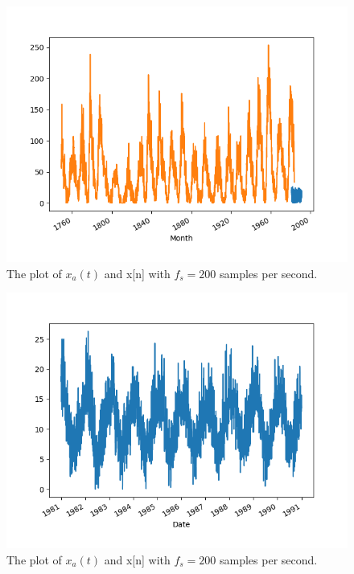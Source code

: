 \documentclass[12pt]{article}
\begin{document}
\begin{enumerate}
\begin{figure}[H]
    \centering
    \begin{minipage}[b]{0.8\textwidth}
        \includegraphics[width=\textwidth]{figures/sun.png}
    \end{minipage}
    \caption{The plot of $x_a(t)$ and x[n] with $f_s = 200$ samples per second.}
    \label{fig:1}
\end{figure}

\begin{figure}[H]
    \centering
    \begin{minipage}[b]{0.8\textwidth}
        \includegraphics[width=\textwidth]{figures/temp.png}
    \end{minipage}
    \caption{The plot of $x_a(t)$ and x[n] with $f_s = 200$ samples per second.}
    \label{fig:2}
\end{figure}





\end{enumerate}
\end{document}
